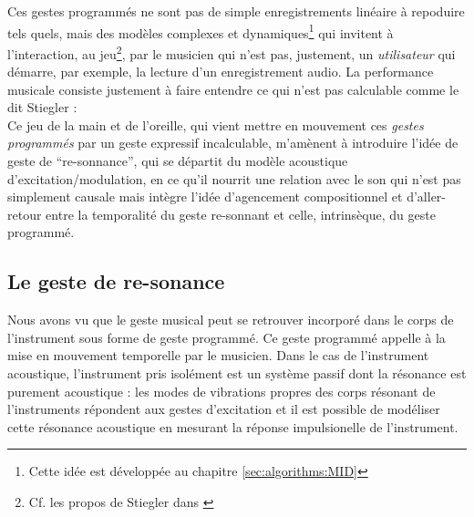 \indent Ces gestes programmés ne sont pas de simple enregistrements linéaire à repoduire tels quels, mais des modèles complexes et dynamiques\footnote{Cette idée est développée au chapitre \ref{sec:algorithms:MID}} qui invitent à l'interaction, au jeu\footnote{Cf. les propos de Stiegler dans \cite{stiegler_circuit_2004} }, par le musicien qui n'est pas, justement, un \textit{utilisateur} qui démarre, par exemple, la lecture d'un enregistrement audio. La performance musicale consiste justement à faire entendre ce qui n'est pas calculable comme le dit Stiegler \cite{stiegler_circuit_2004}: \\
\indent Ce jeu de la main et de l'oreille, qui vient mettre en mouvement ces \textit{gestes programmés} par un geste expressif incalculable, m'amènent à introduire l'idée de geste de ``re-sonnance'', qui se départit du modèle acoustique d'excitation/modulation, en ce qu'il nourrit une relation avec le son qui n'est pas simplement causale mais intègre l'idée d'agencement compositionnel et d'aller-retour entre la temporalité du geste re-sonnant et celle, intrinsèque, du geste programmé.

\subsection{Le geste de re-sonance}

Nous avons vu que le geste musical peut se retrouver incorporé dans le corps de l'instrument sous forme de geste programmé. Ce geste programmé appelle à la mise en mouvement temporelle par le musicien.
Dans le cas de l'instrument acoustique, l'instrument pris isolément est un système passif dont la résonance est purement acoustique : les modes de vibrations propres des corps résonant de l'instruments répondent aux gestes d'excitation et il est possible de modéliser cette résonance acoustique en mesurant la réponse impulsionelle de l'instrument.

